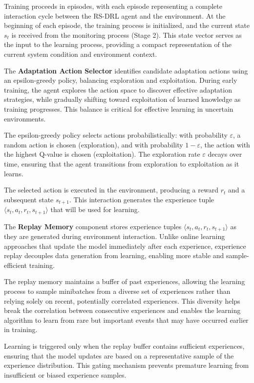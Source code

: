 \documentclass[11pt,a4paper]{article}
\begin{document}
Training proceeds in episodes, with each episode representing a complete interaction cycle between the RS-DRL agent and the environment. At the beginning of each episode, the training process is initialized, and the current state $s_t$ is received from the monitoring process (Stage 2). This state vector serves as the input to the learning process, providing a compact representation of the current system condition and environment context.

The \textbf{Adaptation Action Selector} identifies candidate adaptation actions using an epsilon-greedy policy, balancing exploration and exploitation. During early training, the agent explores the action space to discover effective adaptation strategies, while gradually shifting toward exploitation of learned knowledge as training progresses. This balance is critical for effective learning in uncertain environments.

The epsilon-greedy policy selects actions probabilistically: with probability $\varepsilon$, a random action is chosen (exploration), and with probability $1-\varepsilon$, the action with the highest Q-value is chosen (exploitation). The exploration rate $\varepsilon$ decays over time, ensuring that the agent transitions from exploration to exploitation as it learns.

The selected action is executed in the environment, producing a reward $r_t$ and a subsequent state $s_{t+1}$. This interaction generates the experience tuple $\langle s_t, a_t, r_t, s_{t+1} \rangle$ that will be used for learning.

The \textbf{Replay Memory} component stores experience tuples $\langle s_t, a_t, r_t, s_{t+1} \rangle$ as they are generated during environment interaction. Unlike online learning approaches that update the model immediately after each experience, experience replay decouples data generation from learning, enabling more stable and sample-efficient training.

The replay memory maintains a buffer of past experiences, allowing the learning process to sample minibatches from a diverse set of experiences rather than relying solely on recent, potentially correlated experiences. This diversity helps break the correlation between consecutive experiences and enables the learning algorithm to learn from rare but important events that may have occurred earlier in training.

Learning is triggered only when the replay buffer contains sufficient experiences, ensuring that the model updates are based on a representative sample of the experience distribution. This gating mechanism prevents premature learning from insufficient or biased experience samples.
\end{document}

